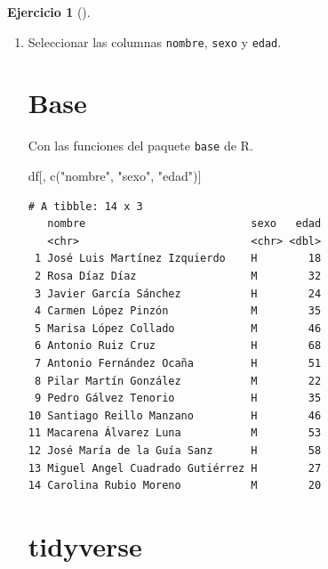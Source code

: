 \documentclass[
  spanish,
  a4paper,
]{scrreport}
\newenvironment{Shaded}{\begin{snugshade}}{\end{snugshade}}
\newcommand{\FunctionTok}[1]{\textcolor[rgb]{0.28,0.35,0.67}{#1}}
\newcommand{\NormalTok}[1]{\textcolor[rgb]{0.00,0.23,0.31}{#1}}
\newcommand{\StringTok}[1]{\textcolor[rgb]{0.13,0.47,0.30}{#1}}
\theoremstyle{definition}
\newtheorem{exercise}{Ejercicio}[chapter]
\theoremstyle{remark}
\begin{document}
\begin{exercise}[]
\begin{enumerate}
\begin{tcolorbox}
  \end{tcolorbox}
\item
  Seleccionar las columnas \texttt{nombre}, \texttt{sexo} y
  \texttt{edad}.

  \begin{tcolorbox}[enhanced jigsaw, titlerule=0mm, arc=.35mm, rightrule=.15mm, opacitybacktitle=0.6, leftrule=.75mm, colframe=quarto-callout-tip-color-frame, toptitle=1mm, breakable, colbacktitle=quarto-callout-tip-color!10!white, bottomrule=.15mm, colback=white, left=2mm, bottomtitle=1mm, opacityback=0, title=\textcolor{quarto-callout-tip-color}{\faLightbulb}\hspace{0.5em}{Solución}, toprule=.15mm, coltitle=black]

  \section{Base}

  Con las funciones del paquete \texttt{base} de R.

\begin{Shaded}
\begin{Highlighting}[]
\NormalTok{df[, }\FunctionTok{c}\NormalTok{(}\StringTok{"nombre"}\NormalTok{, }\StringTok{"sexo"}\NormalTok{, }\StringTok{"edad"}\NormalTok{)]}
\end{Highlighting}
\end{Shaded}

\begin{verbatim}
# A tibble: 14 x 3
   nombre                          sexo   edad
   <chr>                           <chr> <dbl>
 1 José Luis Martínez Izquierdo    H        18
 2 Rosa Díaz Díaz                  M        32
 3 Javier García Sánchez           H        24
 4 Carmen López Pinzón             M        35
 5 Marisa López Collado            M        46
 6 Antonio Ruiz Cruz               H        68
 7 Antonio Fernández Ocaña         H        51
 8 Pilar Martín González           M        22
 9 Pedro Gálvez Tenorio            H        35
10 Santiago Reillo Manzano         H        46
11 Macarena Álvarez Luna           M        53
12 José María de la Guía Sanz      H        58
13 Miguel Angel Cuadrado Gutiérrez H        27
14 Carolina Rubio Moreno           M        20
\end{verbatim}

  \section{tidyverse}


\end{tcolorbox}
\end{enumerate}
\end{exercise}
\end{document}

